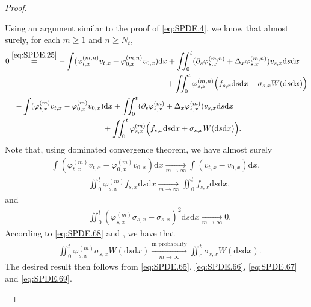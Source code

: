 \documentclass[12pt,a4paper]{amsart}
\numberwithin{equation}{section}
\theoremstyle{plain}
\theoremstyle{remark}
\newenvironment{proof*}[1][\proofname]{
	\renewcommand\qedsymbol{\rule{3mm}{3mm}}
	\begin{proof}[#1]}{\end{proof}}
\begin{document}
\begin{proof}
\begin{proof*}
	Using an argument similar to the proof of \eqref{eq:SPDE.4}, we know that almost surely, for each $m\geq 1$ and $n \geq N_t$,
\begin{align}
&\begin{multlined}	
	0 \overset{\eqref{eq:SPDE.25}}= - \int (\varphi_{t,x}^{(m,n)} v_{t,x} - \varphi_{0,x}^{(m,n)}v_{0,x}) \mathrm dx  + \iint_0^t (\partial_s \varphi_{s,x}^{(m,n)}  + \Delta_x \varphi_{s,x}^{(m,n)})v_{s,x}\mathrm ds\mathrm dx \\ 
	+ \iint_0^t \varphi_{s,x}^{(m,n)} \Big(f_{s,x}\mathrm ds\mathrm dx+\sigma_{s,x}W(\mathrm ds\mathrm dx)\Big)
\end{multlined}
\\& \label{eq:SPDE.65}\begin{multlined}
= - \int (\varphi_{t,x}^{(m)} v_{t,x} - \varphi_{0,x}^{(m)}v_{0,x}) \mathrm dx  + \iint_0^t (\partial_s \varphi_{s,x}^{(m)}  + \Delta_x \varphi_{s,x}^{(m)})v_{s,x}\mathrm ds\mathrm dx 
\\ + \iint_0^t \varphi_{s,x}^{(m)} \Big(f_{s,x}\mathrm ds\mathrm dx+\sigma_{s,x}W(\mathrm ds\mathrm dx)\Big).
\end{multlined}
\end{align}
	Note that, using dominated convergence theorem, we have almost surely
\begin{align}\label{eq:SPDE.66}
	\int (\varphi_{t,x}^{(m)} v_{t,x} - \varphi_{0,x}^{(m)}v_{0,x}) \mathrm dx
	\xrightarrow[m\to \infty]{} \int ( v_{t,x} - v_{0,x}) \mathrm dx,
\end{align} 
\begin{align} \label{eq:SPDE.67}
&  \iint_0^t \varphi_{s,x}^{(m)} f_{s,x}\mathrm ds\mathrm dx 
\xrightarrow[m\to \infty]{} \iint_0^t f_{s,x}\mathrm ds\mathrm dx,
\end{align}
and 
\begin{align} \label{eq:SPDE.68}
&  \iint_0^t (\varphi_{s,x}^{(m)} \sigma_{s,x} - \sigma_{s,x})^2\mathrm ds\mathrm dx 
\xrightarrow[m\to \infty]{} 0.
\end{align}
According to \eqref{eq:SPDE.68} and \cite[Proposition 17.6]{Kallenberg2002Foundations}, we have that 
 \begin{align} \label{eq:SPDE.69}
 &  \iint_0^t \varphi_{s,x}^{(m)} \sigma_{s,x} W(\mathrm ds\mathrm dx)
 \xrightarrow[m\to \infty]{\text{in probability}}   \iint_0^t  \sigma_{s,x} W(\mathrm ds\mathrm dx).
 \end{align}
 The desired result then follows from \eqref{eq:SPDE.65}, \eqref{eq:SPDE.66}, \eqref{eq:SPDE.67} and \eqref{eq:SPDE.69}.

\end{proof*}
\end{proof}
\end{document}
